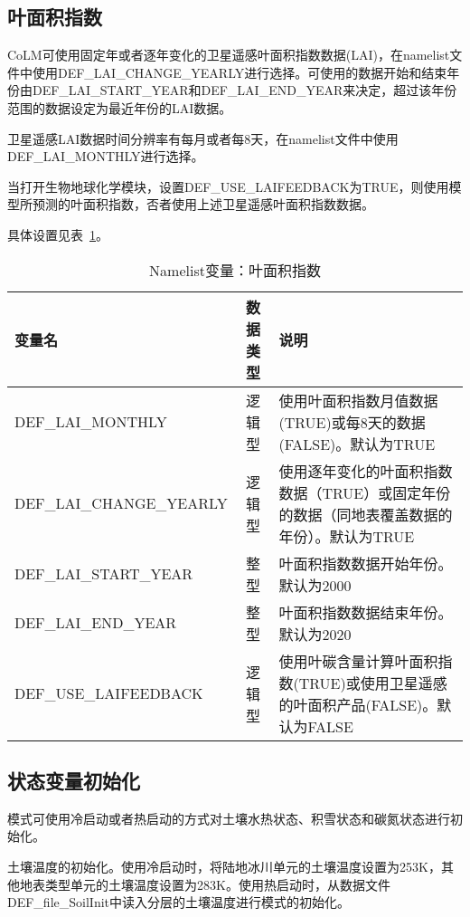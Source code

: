 \documentclass[a4paper,12pt,twoside]{article}
\begin{document}
\subsection{叶面积指数} \label{subsection_lai}

CoLM可使用固定年或者逐年变化的卫星遥感叶面积指数数据(LAI)，在namelist文件中使用DEF\_LAI\_CHANGE\_YEARLY进行选择。可使用的数据开始和结束年份由DEF\allowbreak\_LAI\allowbreak\_START\allowbreak\_YEAR和DEF\_LAI\_END\_YEAR来决定，超过该年份范围的数据设定为最近年份的LAI数据。

卫星遥感LAI数据时间分辨率有每月或者每8天，在namelist文件中使用DEF\allowbreak\_LAI\allowbreak\_MONTHLY进行选择。

当打开生物地球化学模块，设置DEF\_USE\_LAIFEEDBACK为TRUE，则使用模型所预测的叶面积指数，否者使用上述卫星遥感叶面积指数数据。

具体设置见表~\ref{table_nl_lai}。

\begin{table}[!htbp] \small
\caption{Namelist变量：叶面积指数}
\label{table_nl_lai}
\centering \renewcommand{\arraystretch}{1.5}
\begin{tabular}{lcp{}}
\toprule
\textbf{变量名} & \textbf{数据类型} & \textbf{说明} \\\midrule
DEF\_LAI\_MONTHLY & 逻辑型 & 使用叶面积指数月值数据(TRUE)或每8天的数据(FALSE)。默认为TRUE\\
DEF\_LAI\_CHANGE\_YEARLY  & 逻辑型 & 使用逐年变化的叶面积指数数据（TRUE）或固定年份的数据（同地表覆盖数据的年份）。默认为TRUE \\
DEF\_LAI\_START\_YEAR & 整型 & 叶面积指数数据开始年份。默认为2000\\
DEF\_LAI\_END\_YEAR & 整型 & 叶面积指数数据结束年份。默认为2020\\
DEF\_USE\_LAIFEEDBACK & 逻辑型 & 使用叶碳含量计算叶面积指数(TRUE)或使用卫星遥感的叶面积产品(FALSE)。默认为FALSE \\
\bottomrule
\end{tabular} 
\end{table}


\subsection{状态变量初始化}

模式可使用冷启动或者热启动的方式对土壤水热状态、积雪状态和碳氮状态进行初始化。

土壤温度的初始化。使用冷启动时，将陆地冰川单元的土壤温度设置为253K，其他地表类型单元的土壤温度设置为283K。使用热启动时，从数据文件DEF\_file\_SoilInit中读入分层的土壤温度进行模式的初始化。
\end{document}
